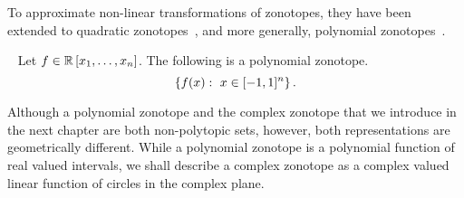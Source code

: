 To approximate non-linear transformations of zonotopes, they have been
extended to quadratic zonotopes~\cite{DBLP:conf/aplas/AdjeGW15}, and more generally, polynomial
zonotopes~\cite{DBLP:conf/hybrid/Althoff13}. 
%
\begin{definition}~\cite{DBLP:conf/hybrid/Althoff13}
Let $f\in\mathbb{R}\left[x_1,\ldots,x_n\right]$.  The following is a
polynomial zonotope.
%
\[\left\{f(x):~x\in[-1,1]^n\right\}.\]
%
\end{definition}
%
Although a polynomial zonotope and the complex zonotope that we
introduce in the next chapter are both non-polytopic sets, however,
both representations are geometrically different.  While a polynomial
zonotope is a polynomial function of real valued intervals, we shall
describe  a complex zonotope as a complex valued linear function
of circles in the complex plane.
